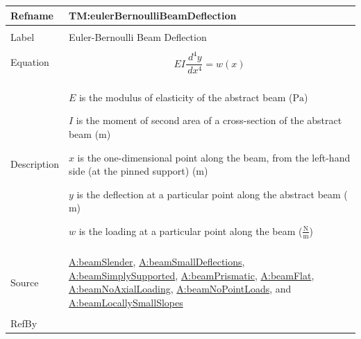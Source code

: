 \documentclass[12pt]{article}
\begin{document}
\begin{minipage}{\textwidth}
\begin{tabular}{>{\raggedright}p{}>{\raggedright\arraybackslash}p{}}
\toprule \textbf{Refname} & \textbf{TM:eulerBernoulliBeamDeflection}
\label{TM:eulerBernoulliBeamDeflection}
\\ \midrule \\
Label & Euler-Bernoulli Beam Deflection
        
\\ \midrule \\
Equation & \begin{displaymath}
           E I \frac{\,d^{4}y}{\,dx^{4}}=w\left(x\right)
           \end{displaymath}
\\ \midrule \\
Description & \begin{symbDescription}
              \item{$E$ is the modulus of elasticity of the abstract beam (${\text{Pa}}$)}
              \item{$I$ is the moment of second area of a cross-section of the abstract beam (${\text{m}}$)}
              \item{$x$ is the one-dimensional point along the beam, from the left-hand side (at the pinned support) (${\text{m}}$)}
              \item{$y$ is the deflection at a particular point along the abstract beam (${\text{m}}$)}
              \item{$w$ is the loading at a particular point along the beam ($\frac{\text{N}}{\text{m}}$)}
              \end{symbDescription}
\\ \midrule \\
Source & \hyperref[beamSlender]{A:beamSlender}, \hyperref[beamSmallDeflections]{A:beamSmallDeflections}, \hyperref[beamSimplySupported]{A:beamSimplySupported}, \hyperref[beamPrismatic]{A:beamPrismatic}, \hyperref[beamFlat]{A:beamFlat}, \hyperref[beamNoAxialLoading]{A:beamNoAxialLoading}, \hyperref[beamNoPointLoads]{A:beamNoPointLoads}, and \hyperref[beamLocallySmallSlopes]{A:beamLocallySmallSlopes}
         
\\ \midrule \\
RefBy & 
\\ \bottomrule
\end{tabular}
\end{minipage}
\end{document}
